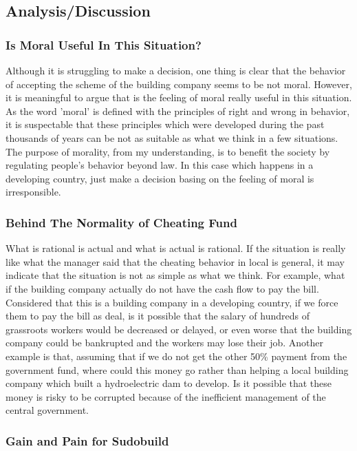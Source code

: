\documentclass[11pt, a4paper]{article}
\begin{document}
\subsection{Analysis/Discussion}

\subsubsection{Is Moral Useful In This Situation?}

Although it is struggling to make a decision, one thing is clear that the behavior of accepting the scheme of the building company seems to be not moral. However, it is meaningful to argue that is the feeling of moral really useful in this situation. As the word 'moral' is defined with the principles of right and wrong in behavior, it is suspectable that these principles which were developed during the past thousands of years can be not as suitable as what we think in a few situations. The purpose of morality, from my understanding, is to benefit the society by regulating people's behavior beyond law. In this case which happens in a developing country, just make a decision basing on the feeling of moral is irresponsible.

\subsubsection{Behind The Normality of Cheating Fund}

What is rational is actual and what is actual is rational. If the situation is really like what the manager said that the cheating behavior in local is general, it may indicate that the situation is not as simple as what we think. For example, what if the building company actually do not have the cash flow to pay the bill. Considered that this is a building company in a developing country, if we force them to pay the bill as deal, is it possible that the salary of hundreds of grassroots workers would be decreased or delayed, or even worse that the building company could be bankrupted and the workers may lose their job. Another example is that, assuming that if we do not get the other 50\% payment from the government fund, where could this money go rather than helping a local building company which built a hydroelectric dam to develop. Is it possible that these money is risky to be corrupted because of the inefficient management of the central government.

\subsubsection{Gain and Pain for Sudobuild}
\end{document}

